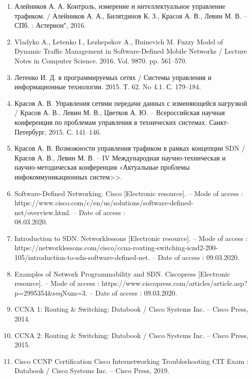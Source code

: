 
\begin{enumerate}[{label=\arabic{*}}]
    \item Алейников А. А. Контроль, измерение и интеллектуальное управление трафиком. / Алейников А. А., Билятдинов К. З., Красов А. В., Левин М. В. -- СПб. : Астерион", 2016.
    \item Vladyko A., Letenko I., Lezhepekov A., Buinevich M. Fuzzy Model of Dynamic Traffic Management in Software-Defined Mobile Networks / Lecture Notes in Computer Science. 2016. Vol. 9870.
pp. 561–570.
    \item Летенко И. Д. в программируемых сетях / Системы управления и информационные технологии. 2015. Т. 62. No 4.1. С. 179–184.
    \item Красов А. В. Управления сетями передачи данных с изменяющейся нагрузкой / Красов А. В., Левин М. В., Цветков А. Ю. -- Всероссийская научная конференция по проблемам управления в технических системах. Санкт-Петербург, 2015. С. 141–146.
    \item Красов А. В. Возможности управления трафиком в рамках концепции
SDN / Красов А. В., Левин М. В. -- IV Международная научно-техническая и научно-методическая конференция «Актуальные проблемы инфокоммуникационных систем>>.
    \item Software-Defined Networking. Cisco [Electronic resource]. – Mode of access : \\
    https://www.cisco.com/c/en/us/solutions/software-defined-net/overview.html. – Date of access : \\
    08.03.2020.
    \item Introduction to SDN. Networklessons [Electronic resource]. – Mode of access : \\
    https://network\-lessons.com/cisco/ccna-routing-switching-icnd2-200-105/introduction-to-sdn-softwa\-re-defined-net. – Date of access : 09.03.2020.
    \item Examples of Network Programmability and SDN. Ciscopress [Electronic resource]. – Mode of access : https://www.ciscopress.com/articles/article.asp?p=2995354\&seqNum=3. – Date of access : 09.03.2020.
    \item CCNA 1: Routing \& Switching: Databook / Cisco Systems Inc. – Cisco Press, 2014.
    \item CCNA 2: Routing \& Switching: Databook / Cisco Systems Inc. – Cisco Press, 2015.
    \item Cisco CCNP Certification Cisco Internetworking Troubleshooting CIT Exam : Databook / Cisco Systems Inc. – Cisco Press, 2019.

\end{enumerate}
